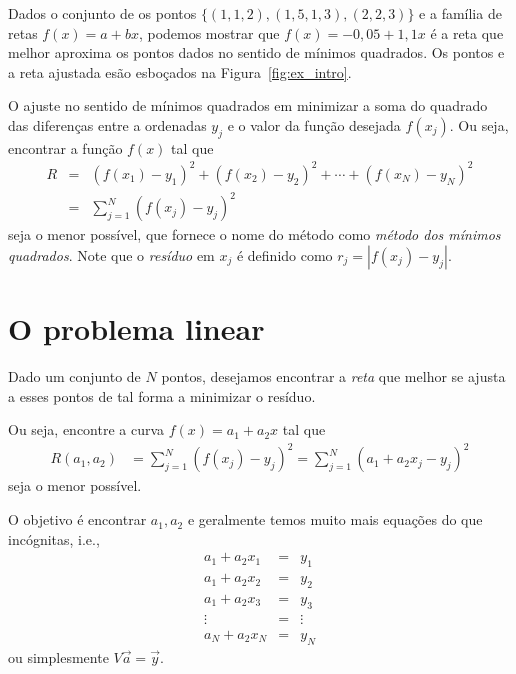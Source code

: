 \begin{ex}\label{ex:intro_ajuste}
  Dados o conjunto de os pontos $\{(1, 1,2), (1,5, 1,3), (2, 2,3)\}$ e a família de retas $f(x) = a + bx$, podemos mostrar que $f(x) = -0,05 + 1,1x$ é a reta que melhor aproxima os pontos dados no sentido de mínimos quadrados.  Os pontos e a reta ajustada esão esboçados na Figura~\ref{fig:ex_intro}.
\end{ex}

O ajuste no sentido de mínimos quadrados em minimizar a soma do quadrado das diferenças entre a ordenadas $y_j$ e o valor da função desejada $f(x_j)$. Ou seja, encontrar a  função $f(x)$ tal que 
\begin{eqnarray*}
  R &=&(f(x_1)-y_1)^2+(f(x_2)-y_2)^2+\cdots +(f(x_N)-y_N)^2\\
    &=&\sum_{j=1}^N (f(x_j)-y_j)^2
\end{eqnarray*}
seja o menor possível, que fornece o nome do método como \emph{método dos mínimos quadrados}.  Note que o \emph{resíduo} em $x_j$ é definido como $r_j=|f(x_j)-y_j|$. 


\section{O problema linear}

Dado um conjunto de $N$ pontos, desejamos encontrar a \textit{reta} que melhor se ajusta a esses pontos de tal forma a minimizar o resíduo.

Ou seja, encontre a curva $f(x)=a_1+a_2 x$ tal que 
\begin{eqnarray*}
  R(a_1,a_2) &=\sum_{j=1}^N (f(x_j)-y_j)^2 = \sum_{j=1}^N (a_1 + a_2 x_j-y_j)^2
\end{eqnarray*}
seja o menor possível.

O objetivo é encontrar $a_1, a_2$ e geralmente temos muito mais equações do que incógnitas, i.e.,
\begin{eqnarray*}
 a_1+a_2 x_1 &=&y_1 \\
 a_1+a_2 x_2 &=&y_2 \\
 a_1+a_2 x_3 &=&y_3 \\
  \vdots     &=& \vdots \\
 a_N+a_2 x_N &=&y_N   
\end{eqnarray*}
ou simplesmente $V\vec a= \vec y$.

